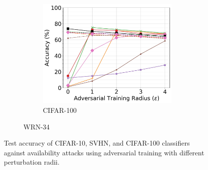 \documentclass[conference]{IEEEtran}
\theoremstyle{definition}
\theoremstyle{remark}
\theoremstyle{proposition}
\begin{document}
\begin{figure}[p!]
\begin{subfigure}{1.0\textwidth}
	\begin{subfigure}{.3\textwidth}
		\centering
		\includegraphics[width=1.0\textwidth]{WRN-34_AT_CIFAR-100.jpg}
		\caption*{CIFAR-100}
		\label{fig:at_cifar100:wrn34}
	\end{subfigure}
    \caption{WRN-34}
	\label{fig:at_wrn34}
    \end{subfigure}
    \caption{Test accuracy of CIFAR-10, SVHN, and CIFAR-100 classifiers against availability attacks using adversarial training with different perturbation radii.}
    \label{fig:at_all}
\end{figure}
\end{document}
